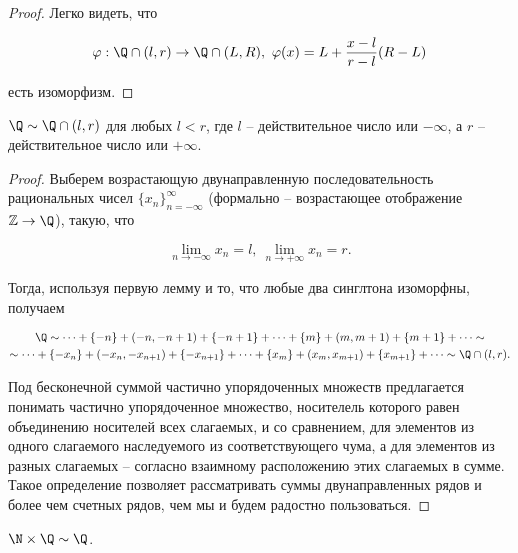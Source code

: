 		\begin{proof}
			Легко видеть, что

			\begin{equation*}
				\varphi: \Q \cap (l, r) \to \Q \cap (L, R), \ \varphi(x) = L + \frac{x - l}{r - l} (R - L)
			\end{equation*}

			есть изоморфизм.
		\end{proof}

		\begin{lemma}
			$\Q \sim \Q \cap (l, r)$ для любых $l < r$, где $l$ -- действительное число или $-\infty$, а $r$ -- действительное число или $+\infty$.
		\end{lemma}

		\begin{proof}
			Выберем возрастающую двунаправленную последовательность рациональных чисел $\{x_n\}_{n=-\infty}^\infty$ (формально -- возрастающее отображение $\mathbb{Z} \to \Q$), такую, что

			\begin{equation*}
				\lim_{n \to -\infty} x_n = l, \ \lim_{n \to +\infty} x_n = r.
			\end{equation*}

			Тогда, используя первую лемму и то, что любые два синглтона изоморфны, получаем

			\begin{multline*}
				\Q \sim \dots + \{-n\} + (-n, -n+1) + \{-n+1\} + \dots + \{m\} + (m, m+1) + \{m+1\} + \dots \sim \\
				\sim \dots + \{-x_n\} + (-x_n, -x_{n+1}) + \{-x_{n+1}\} + \dots + \{x_m\} + (x_m, x_{m+1}) + \{x_{m+1}\} + \dots \sim \Q \cap (l, r).
			\end{multline*}

			Под бесконечной суммой частично упорядоченных множеств предлагается понимать частично упорядоченное множество, носителель которого равен объединению носителей всех слагаемых, и со сравнением, для элементов из одного слагаемого наследуемого из соответствующего чума, а для элементов из разных слагаемых -- согласно взаимному расположению этих слагаемых в сумме. Такое определение позволяет рассматривать суммы двунаправленных рядов и более чем счетных рядов, чем мы и будем радостно пользоваться.
		\end{proof}

		\begin{lemma}
			$\N \times \Q \sim \Q$.
		\end{lemma}

